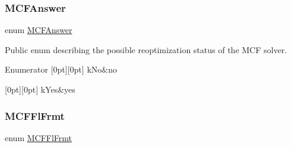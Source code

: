 \subsubsection{\texorpdfstring{M\+C\+F\+Answer}{MCFAnswer}}
{\footnotesize\ttfamily enum \mbox{\hyperlink{class_m_c_f_class_ad7b7f4459be059eae1a7d83a8e190c28}{M\+C\+F\+Answer}}}

Public enum describing the possible reoptimization status of the M\+CF solver. \begin{DoxyEnumFields}{Enumerator}
[0pt][0pt]{}\mbox{\label{class_m_c_f_class_ad7b7f4459be059eae1a7d83a8e190c28a503f4e9dca6c8c12ea38f9e8c1be0126}} 
k\+No&no \\
\hline

[0pt][0pt]{}\mbox{\label{class_m_c_f_class_ad7b7f4459be059eae1a7d83a8e190c28ace5b3b5f2037b0d65d161b53b7c940fe}} 
k\+Yes&yes \\
\hline

\end{DoxyEnumFields}
\mbox{\label{class_m_c_f_class_adb1b139bac65f5f35bdadc7549a819de}} 
\subsubsection{\texorpdfstring{M\+C\+F\+Fl\+Frmt}{MCFFlFrmt}}
{\footnotesize\ttfamily enum \mbox{\hyperlink{class_m_c_f_class_adb1b139bac65f5f35bdadc7549a819de}{M\+C\+F\+Fl\+Frmt}}}

